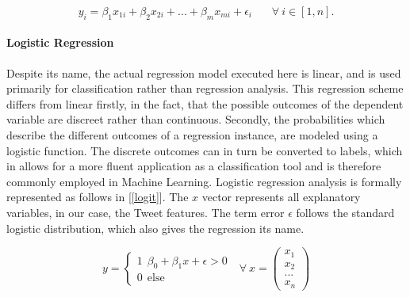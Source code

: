 	\begin{equation}
		y_i = \beta_1 x_{1i}+ \beta_2 x_{2i} + ... + \beta_m x_{mi} + \epsilon_i \ \ \ \ \ \ \ \ 
		\forall \ i \in [1,n].
		\label{lin_reg}
	\end{equation}
	
	\paragraph{Logistic Regression} Despite its name, the actual regression model executed here is linear, and is used primarily for classification rather than regression analysis. This regression scheme differs from linear firstly, in the fact, that the possible outcomes of the dependent variable are discreet rather than continuous. Secondly, the probabilities which describe the different outcomes of a regression instance, are modeled using a logistic function. The discrete outcomes can in turn be converted to labels, which in allows for a more fluent application as a classification tool and is therefore commonly employed in  Machine Learning. Logistic regression analysis is formally represented as follows in  [\ref{logit}]. The $x$ vector represents all explanatory variables, in our case, the Tweet features. The term error $\epsilon$ follows the standard logistic distribution, which also gives the regression its name. 
	
	\begin{equation}
		y = 
		\begin{cases}
		1 \ \  \beta_0 + \beta_1 x + \epsilon > 0 \\
		0 \ \  \text{else } 
		\end{cases} \text{         } \forall \  x = 
		\begin{pmatrix}x_1\\x_2\\...\\x_n \end{pmatrix}
		\label{logit}
	\end{equation}